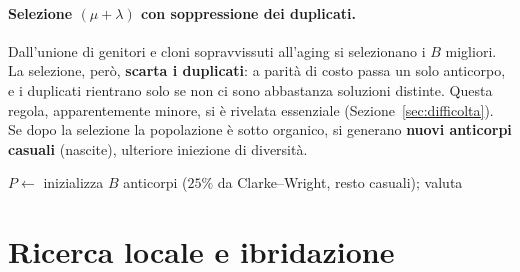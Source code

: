 \documentclass[10pt,a4paper]{article}
\begin{document}
\paragraph{Selezione $(\mu+\lambda)$ con soppressione dei duplicati.} Dall'unione
di genitori e cloni sopravvissuti all'aging si selezionano i $B$ migliori. La
selezione, però, \textbf{scarta i duplicati}: a parità di costo passa un solo
anticorpo, e i duplicati rientrano solo se non ci sono abbastanza soluzioni
distinte. Questa regola, apparentemente minore, si è rivelata essenziale
(Sezione~\ref{sec:difficolta}). Se dopo la selezione la popolazione è sotto
organico, si generano \textbf{nuovi anticorpi casuali} (nascite), ulteriore
iniezione di diversità.

\begin{algorithm}[H]
\SetAlgoLined
\DontPrintSemicolon
{}
$P \leftarrow$ inizializza $B$ anticorpi ($25\%$ da Clarke--Wright, resto casuali); valuta\;
\caption{Algoritmo immunologico a selezione clonale, ibridato con ricerca locale}
\label{alg:immune}
\end{algorithm}

\section{Ricerca locale e ibridazione}
\label{sec:ls}
\end{document}
